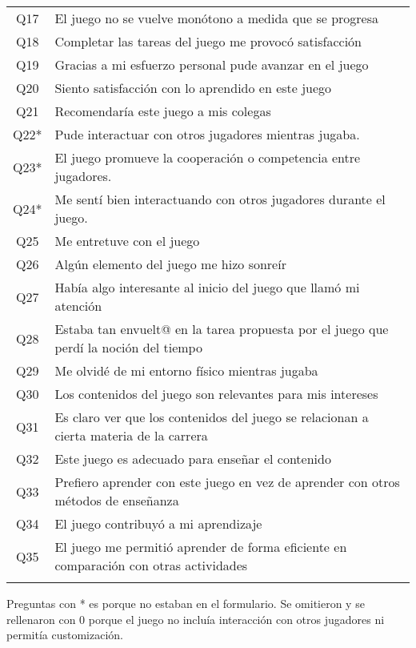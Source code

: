 \begin{table}[h]
\begin{tabular}{|c|l|}
Q17      & El juego no se vuelve monótono a medida que se progresa \\
Q18      & Completar las tareas del juego me provocó satisfacción \\
Q19      & Gracias a mi esfuerzo personal pude avanzar en el juego \\
Q20      & Siento satisfacción con lo aprendido en este juego \\
Q21      & Recomendaría este juego a mis colegas \\
Q22*     & Pude interactuar con otros jugadores mientras jugaba. \\
Q23*     & El juego promueve la cooperación o competencia entre jugadores. \\
Q24*     & Me sentí bien interactuando con otros jugadores durante el juego. \\
Q25      & Me entretuve con el juego \\
Q26      & Algún elemento del juego me hizo sonreír \\
Q27      & Había algo interesante al inicio del juego que llamó mi atención \\
Q28      & Estaba tan envuelt@ en la tarea propuesta por el juego que perdí la noción del tiempo \\
Q29      & Me olvidé de mi entorno físico mientras jugaba \\
Q30      & Los contenidos del juego son relevantes para mis intereses \\
Q31      & Es claro ver que los contenidos del juego se relacionan a cierta materia de la carrera \\
Q32      & Este juego es adecuado para enseñar el contenido \\
Q33      & Prefiero aprender con este juego en vez de aprender con otros métodos de enseñanza \\
Q34      & El juego contribuyó a mi aprendizaje \\
Q35      & El juego me permitió aprender de forma eficiente en comparación con otras actividades \\
& \\

\hline
\end{tabular}
\vspace{0.5em} %
\par
Preguntas con * es porque no estaban en el formulario. Se omitieron y se rellenaron con 0 porque el juego no incluía interacción con otros jugadores ni permitía customización.

\end{table}

\restoregeometry
